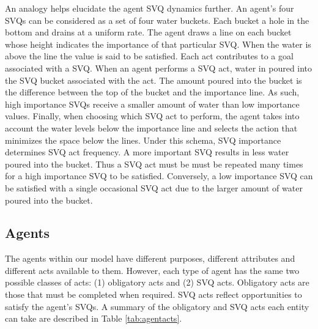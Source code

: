 \documentclass{scspaperproc}
\theoremstyle{scsthe}
\begin{document}
An analogy helps elucidate the agent SVQ dynamics further. An agent's four SVQs can be considered as a set of four water buckets. Each bucket a hole in the bottom and drains at a uniform rate. The agent draws a line on each bucket whose height indicates the importance of that particular SVQ. When the water is above the line the value is said to be satisfied. Each act contributes to a goal associated with a SVQ. When an agent performs a SVQ act, water in poured into the SVQ bucket associated with the act. The amount poured into the bucket is the difference between the top of the bucket and the importance line. As such, high importance SVQs receive a smaller amount of water than low importance values. Finally, when choosing which SVQ act to perform, the agent takes into account the water levels below the importance line and selects the action that minimizes the space below the lines. Under this schema, SVQ importance determines SVQ act frequency. A more important SVQ results in less water poured into the bucket. Thus a SVQ act must be must be repeated many times for a high importance SVQ to be satisfied. Conversely, a low importance SVQ can be satisfied with a single occasional SVQ act due to the larger amount of water poured into the bucket. 

\subsection{Agents}
The agents within our model have different purposes, different attributes and different acts available to them. However, each type of agent has the same two possible classes of acts: (1) obligatory acts and (2) SVQ acts.  Obligatory acts are those that must be completed when required. SVQ acts reflect opportunities to satisfy the agent's SVQs. A summary of the obligatory and SVQ acts each entity can take are described in Table \ref{tab:agentacts}.
\end{document}
